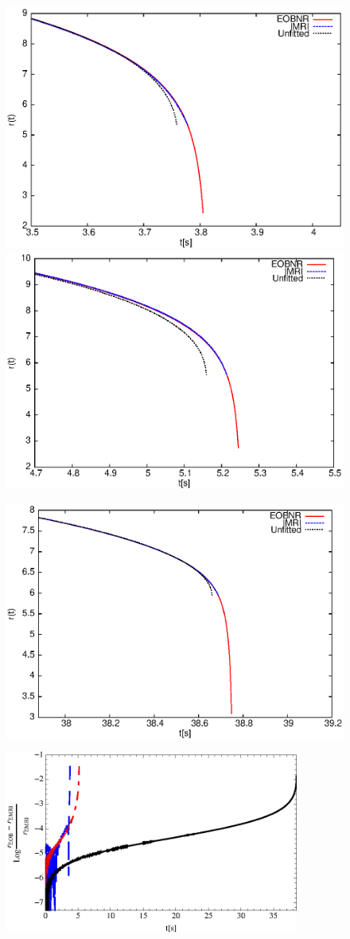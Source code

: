 \begin{figure}[ht]
\centerline{
\includegraphics[height=0.38\textwidth,  clip]{figures/insimri/imem17100comp}
\includegraphics[height=0.38\textwidth,  clip]{figures/insimri/imem10100comptwo}
}
\centerline{
\includegraphics[height=0.38\textwidth,  clip]{figures/insimri/imem1100comp}
\includegraphics[height=2.6in, width=3.8in,  clip]{figures/insimri/radaccemri}
}

\end{figure}
